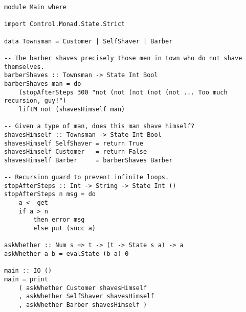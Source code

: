 \documentclass[11pt]{article}
\theoremstyle{plain}
\theoremstyle{definition}
\begin{document}
\begin{verbatim}
module Main where

import Control.Monad.State.Strict

data Townsman = Customer | SelfShaver | Barber

-- The barber shaves precisely those men in town who do not shave themselves.
barberShaves :: Townsman -> State Int Bool
barberShaves man = do
    (stopAfterSteps 300 "not (not (not (not (not ... Too much recursion, guy!")
    liftM not (shavesHimself man)

-- Given a type of man, does this man shave himself?
shavesHimself :: Townsman -> State Int Bool
shavesHimself SelfShaver = return True
shavesHimself Customer   = return False
shavesHimself Barber     = barberShaves Barber

-- Recursion guard to prevent infinite loops.
stopAfterSteps :: Int -> String -> State Int ()
stopAfterSteps n msg = do
    a <- get
    if a > n
        then error msg
        else put (succ a)

askWhether :: Num s => t -> (t -> State s a) -> a
askWhether a b = evalState (b a) 0

main :: IO ()
main = print
    ( askWhether Customer shavesHimself 
    , askWhether SelfShaver shavesHimself 
    , askWhether Barber shavesHimself )
\end{verbatim}
\end{document}
